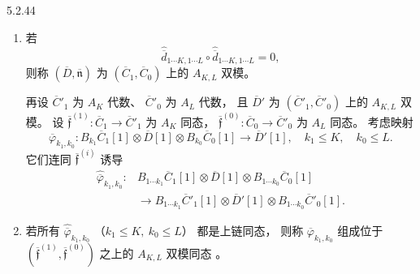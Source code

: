 \begin{definition}{5.2.44}\label{def:5-2-44}
\begin{enumerate}[label=\textup{(\arabic*)},leftmargin=2.8em]
\item 若
\[
\widehat{\overline d}_{1\cdots K,1\cdots L}
\circ
\widehat{\overline d}_{1\cdots K,1\cdots L}
=0,
\]
则称
$(\overline D,\overline{\mathfrak n})$
为 $(\overline C_1,\overline C_0)$
上的 $A_{K,L}$ 双模。

再设 $\overline C'_1$ 为 $A_K$ 代数、
$\overline C'_0$ 为 $A_L$ 代数，
且 $\overline D'$ 为
$(\overline C'_1,\overline C'_0)$
上的 $A_{K,L}$ 双模。
设
$\overline{\mathfrak f}^{(1)}:
\overline C_1\to\overline C'_1$
为 $A_K$ 同态，
$\overline{\mathfrak f}^{(0)}:
\overline C_0\to\overline C'_0$
为 $A_L$ 同态。
考虑映射
\[
\overline\varphi_{k_1,k_0}:
B_{k_1}\overline C_1[1]
\otimes\overline D[1]
\otimes B_{k_0}\overline C_0[1]
\longrightarrow\overline D'[1],
\quad k_1\leq K,\quad k_0\leq L.
\]
它们连同
$\overline{\mathfrak f}^{(i)}$
诱导
\[
\begin{aligned}
\widehat{\overline\varphi}_{k_1,k_0}:
&B_{1\cdots k_1}\overline C_1[1]
\otimes\overline D[1]
\otimes B_{1\cdots k_0}\overline C_0[1]\\
&\longrightarrow
B_{1\cdots k_1}\overline C'_1[1]
\otimes\overline D'[1]
\otimes B_{1\cdots k_0}\overline C'_0[1].
\end{aligned}
\]
\item 若所有
$\widehat{\overline\varphi}_{k_1,k_0}$
（$k_1\leq K,\ k_0\leq L$）
都是上链同态，
则称 $\overline\varphi_{k_1,k_0}$
组成位于
$(\overline{\mathfrak f}^{(1)},
  \overline{\mathfrak f}^{(0)})$
之上的 $A_{K,L}$ 双模同态
。
\end{enumerate}
\end{definition}

